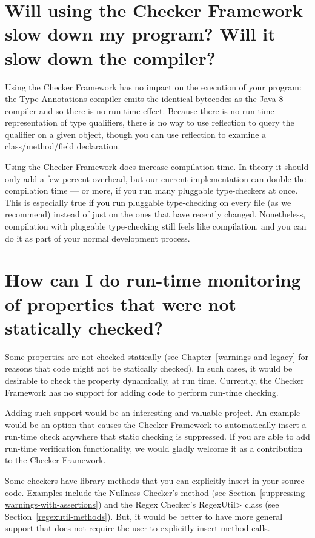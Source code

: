 \section{Will using the Checker Framework slow down my program?  Will it slow down the compiler?\label{faq-slowdown}}

Using the Checker Framework has no impact on the execution of your program:
the Type Annotations compiler emits the identical bytecodes as the Java 8
compiler and so there is no run-time effect.  Because there is no run-time
representation of type qualifiers, there is no way to use reflection to
query the qualifier on a given object, though you can use reflection to
examine a class/method/field declaration.

Using the Checker Framework does increase compilation time.  In theory it
should only add a few percent overhead, but our current implementation
can double the compilation time --- or more, if you run many pluggable
type-checkers at once.  This is especially true if you run pluggable
type-checking on every file (as we recommend) instead of just on the ones
that have recently changed.
Nonetheless, compilation with pluggable type-checking still feels like
compilation, and you can do it as part of your normal development process.


\section{How can I do run-time monitoring of properties that were not statically checked?\label{faq-run-time-checking}}

Some properties are not checked statically (see
Chapter~\ref{warnings-and-legacy} for reasons that code might not be
statically checked).  In such cases, it would be desirable to check the
property dynamically, at run time.
Currently, the Checker Framework has no support for adding code to perform
run-time checking.

Adding such support would be an interesting and valuable project.
An example would be an option that causes the Checker Framework to
automatically insert a run-time check anywhere that static checking is
suppressed.
If you
are able to add run-time verification functionality, we would gladly
welcome it as a contribution to the Checker Framework.

Some checkers have library methods that you can explicitly insert in your
source code.
Examples include the Nullness Checker's
 method (see
Section~\ref{suppressing-warnings-with-assertions}) and the Regex Checker's
\<RegexUtil> class (see Section~\ref{regexutil-methods}).
But, it would be better to have more general support that does not require
the user to explicitly insert method calls.


